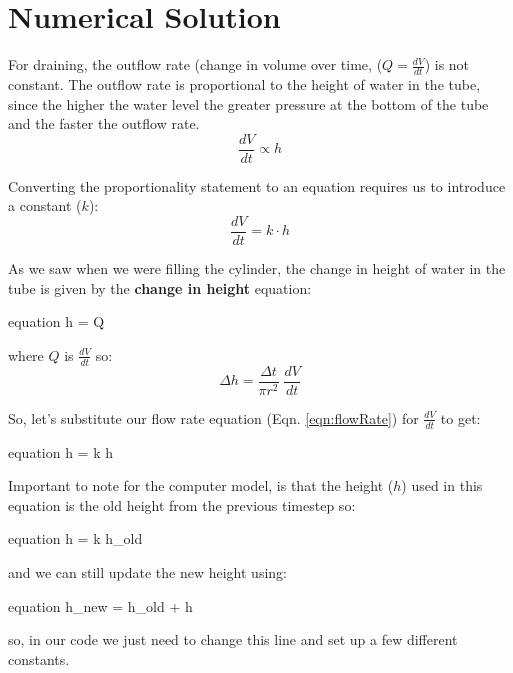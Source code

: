 \documentclass[11pt,fleqn]{book}
\begin{document}
	\section{Numerical Solution}
	
	For draining, the outflow rate (change in volume over time, ($Q=\frac{dV}{dt}$) is not constant. The outflow rate is proportional to the height of water in the tube, since the higher the water level the greater pressure at the bottom of the tube and the faster the outflow rate.
	\begin{equation}
		\frac{dV}{dt} \propto h
	\end{equation}
	
	Converting the proportionality statement to an equation requires us to introduce a constant ($k$):
	\begin{equation}
		\label{eqn:flowRate}
		\frac{dV}{dt} = k \cdot h
	\end{equation}
	
	As we saw when we were filling the cylinder, the change in height of water in the tube is given by the \textbf{change in height} equation:
	\begin{empheq}[box=\fbox]{equation}
		\label{eqn:dh_eqn}
		\Delta h =  \; Q 
	\end{empheq}
	
	where $Q$ is $\frac{dV}{dt}$ so:
	\begin{equation}
		\Delta h = \frac{\Delta t}{\pi r^2} \; \frac{dV}{dt}
	\end{equation}
	
	So, let's substitute our flow rate equation (Eqn. \ref{eqn:flowRate}) for $\frac{dV}{dt}$ to get:
	\begin{empheq}[]{equation}
		\Delta h =  \; k \cdot h
	\end{empheq}
	
	Important to note for the computer model, is that the height ($h$) used in this equation is the old height from the previous timestep so:
	\begin{empheq}[box=\fbox]{equation}
		\Delta h =  \; k \cdot h_{old}
	\end{empheq}
	
	and we can still update the new height using:
	\begin{empheq}[box=\fbox]{equation}
		\label{eqn:hnew_eqn}
		h_{new} = h_{old} + \Delta h
	\end{empheq}
	
	so, in our code we just need to change this line and set up a few different constants.
	
\end{document}
